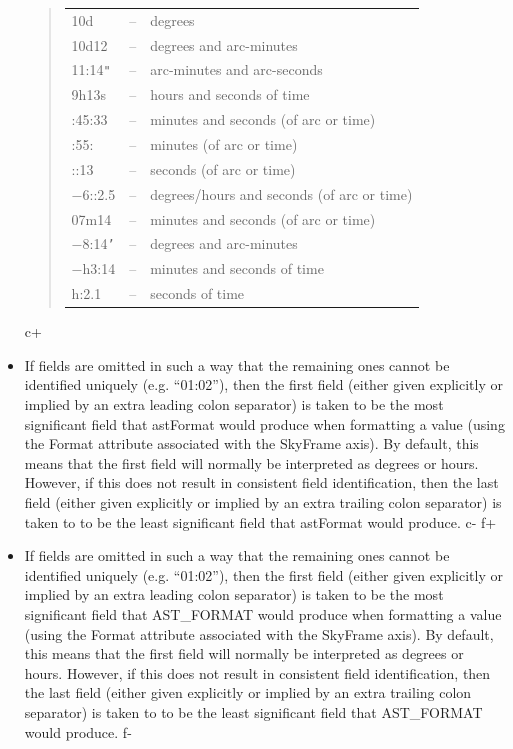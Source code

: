 \documentclass[twoside,11pt]{article}
\begin{document}
\begin{itemize}
\begin{quote}
\begin{tabular}{lll}
10d & -- & degrees \\
10d12 & -- & degrees and arc-minutes \\
11:14{\tt{"}} & -- & arc-minutes and arc-seconds \\
9h13s & -- & hours and seconds of time \\
:45:33 & -- & minutes and seconds (of arc or time) \\
:55: & -- & minutes (of arc or time) \\
::13 & -- & seconds (of arc or time) \\
$-$6::2.5 & -- & degrees/hours and seconds (of arc or time) \\
07m14 & -- & minutes and seconds (of arc or time) \\
$-$8:14{\tt{'}} & -- & degrees and arc-minutes \\
$-$h3:14 & -- & minutes and seconds of time \\
h:2.1 & -- & seconds of time
\end{tabular}
\end{quote}

c+
\item If fields are omitted in such a way that the remaining ones
cannot be identified uniquely (e.g. ``01:02''), then the first field
(either given explicitly or implied by an extra leading colon
separator) is taken to be the most significant field that astFormat
would produce when formatting a value (using the Format attribute
associated with the SkyFrame axis). By default, this means that the
first field will normally be interpreted as degrees or hours. However,
if this does not result in consistent field identification, then the
last field (either given explicitly or implied by an extra trailing
colon separator) is taken to to be the least significant field that
astFormat would produce.
c-
f+
\item If fields are omitted in such a way that the remaining ones
cannot be identified uniquely (e.g. ``01:02''), then the first field
(either given explicitly or implied by an extra leading colon
separator) is taken to be the most significant field that AST\_FORMAT
would produce when formatting a value (using the Format attribute
associated with the SkyFrame axis). By default, this means that the
first field will normally be interpreted as degrees or hours. However,
if this does not result in consistent field identification, then the
last field (either given explicitly or implied by an extra trailing
colon separator) is taken to to be the least significant field that
AST\_FORMAT would produce.
f-

\end{itemize}
\end{document}
